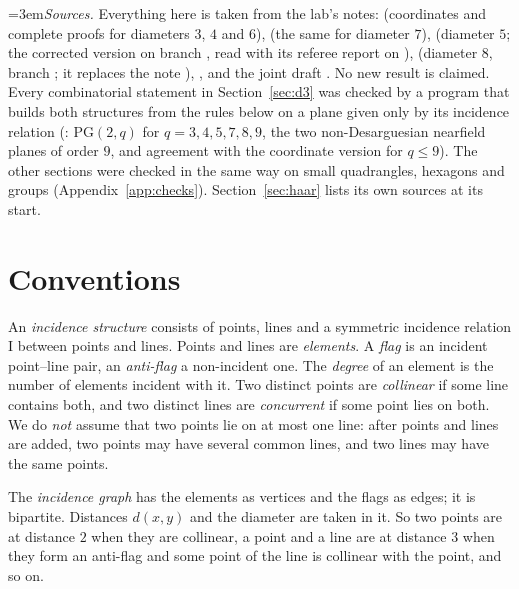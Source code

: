 \documentclass[11pt]{amsart}
\theoremstyle{definition}
\theoremstyle{remark}
\newcommand{\I}{\mathrel{\mathrm{I}}}
\begin{document}
\noindent\emergencystretch=3em\emph{Sources.} Everything here is taken from the lab's notes:  (coordinates and complete proofs for diameters $3$, $4$ and $6$),  (the same for diameter $7$),  (diameter $5$; the corrected version on branch , read with its referee report  on ),  (diameter $8$, branch ; it replaces the note ), ,  and the joint draft . No new result is claimed. Every combinatorial statement in Section~\ref{sec:d3} was checked by a program that builds both structures from the rules below on a plane given only by its incidence relation (: $\mathrm{PG}(2,q)$ for $q=3,4,5,7,8,9$, the two non-Desarguesian nearfield planes of order $9$, and agreement with the coordinate version for $q\le 9$). The other sections were checked in the same way on small quadrangles, hexagons and groups (Appendix~\ref{app:checks}). Section~\ref{sec:haar} lists its own sources at its start.

\setcounter{section}{-1}
\section{Conventions}\label{sec:conv}

An \emph{incidence structure} consists of points, lines and a symmetric incidence relation $\I$ between points and lines. Points and lines are \emph{elements}. A \emph{flag} is an incident point--line pair, an \emph{anti-flag} a non-incident one. The \emph{degree} of an element is the number of elements incident with it. Two distinct points are \emph{collinear} if some line contains both, and two distinct lines are \emph{concurrent} if some point lies on both. We do \emph{not} assume that two points lie on at most one line: after points and lines are added, two points may have several common lines, and two lines may have the same points.

The \emph{incidence graph} has the elements as vertices and the flags as edges; it is bipartite. Distances $d(x,y)$ and the diameter are taken in it. So two points are at distance $2$ when they are collinear, a point and a line are at distance $3$ when they form an anti-flag and some point of the line is collinear with the point, and so on.
\end{document}
